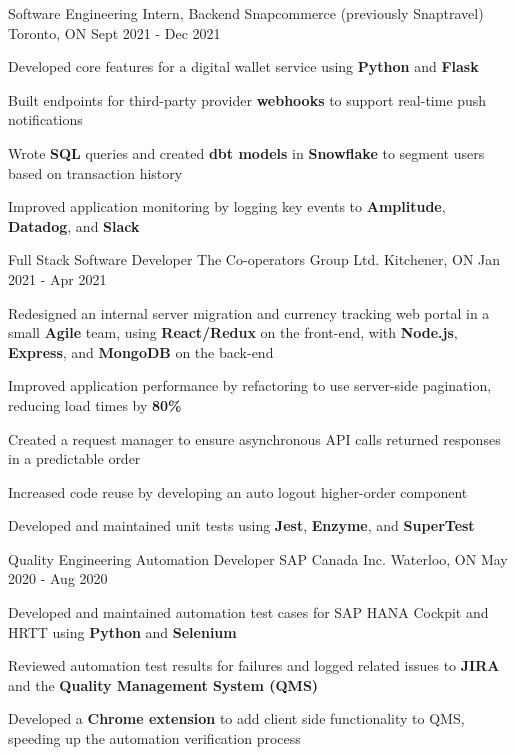 
\begin{cventries}
  \cventry
    {Software Engineering Intern, Backend} %
    {Snapcommerce (previously Snaptravel)} %
    {Toronto, ON} %
    {Sept 2021 - Dec 2021} %
    {
      \begin{cvitems} %
      \item {Developed core features for a digital wallet service using \textbf{Python} and \textbf{Flask}}
      \item {Built endpoints for third-party provider \textbf{webhooks} to support real-time push notifications}
      \item {Wrote \textbf{SQL} queries and created \textbf{dbt models} in \textbf{Snowflake} to segment users based on transaction history}
      \item {Improved application monitoring by logging key events to \textbf{Amplitude}, \textbf{Datadog}, and \textbf{Slack}}
      \end{cvitems}
    }
  \cventry
    {Full Stack Software Developer} %
    {The Co-operators Group Ltd.} %
    {Kitchener, ON} %
    {Jan 2021 - Apr 2021} %
    {
      \begin{cvitems} %
      \item {Redesigned an internal server migration and currency tracking web portal in a small \textbf{Agile} team, using \textbf{React/Redux} on the front-end, with \textbf{Node.js}, \textbf{Express}, and \textbf{MongoDB} on the back-end}
      \item {Improved application performance by refactoring to use server-side pagination, reducing load times by \textbf{80\%}}
      \item {Created a request manager to ensure asynchronous API calls returned responses in a predictable order}
      \item {Increased code reuse by developing an auto logout higher-order component}
      \item {Developed and maintained unit tests using \textbf{Jest}, \textbf{Enzyme}, and \textbf{SuperTest}}
      \end{cvitems}
    }
    
  \cventry
    {Quality Engineering Automation Developer} %
    {SAP Canada Inc.} %
    {Waterloo, ON} %
    {May 2020 - Aug 2020} %
    {
      \begin{cvitems} %
      \item {Developed and maintained automation test cases for SAP HANA Cockpit and HRTT using \textbf{Python} and \textbf{Selenium}}
		  \item {Reviewed automation test results for failures and logged related issues to \textbf{JIRA} and the \textbf{Quality Management System (QMS)}}
		  \item {Developed a \textbf{Chrome extension} to add client side functionality to QMS, speeding up the automation verification process}
      \end{cvitems}
    }
       
\end{cventries}
